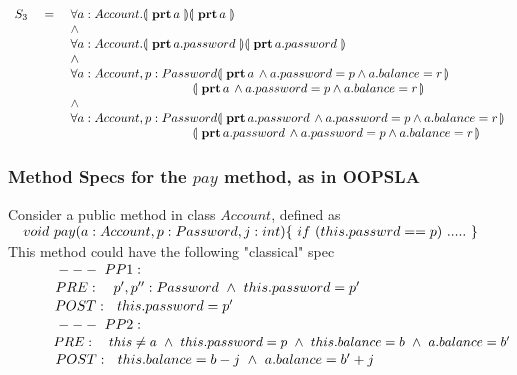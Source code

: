 \begin{example}
$\begin{array}{lcl}
S_3& \ = \ &  \TwoStatesQ {a: Account}{ \inside {a} } {  \inside {a}  }\\
& & \wedge \\
& &  \TwoStatesQ {a: Account}{ \inside {a.password} } {  \inside {a.password}  }\\
& & \wedge\\
& & \forall {a: Account, p: Password}\FirstState{ \inside {a}  \wedge a.password=p \wedge a.balance=r  } \\
& & \strut \hspace{3.45cm} 
                     \SecondState {  \inside {a}  \wedge a.password=p \wedge a.balance=r   }
                     \\
                     & & \wedge\\
& & \forall {a: Account, p: Password}\FirstState{   \inside {a.password} \wedge a.password=p \wedge a.balance=r  } \\
& & \strut \hspace{3.45cm} 
                     \SecondState { \inside {a.password}  \wedge a.password=p \wedge a.balance=r  }
\end{array}
$

\end{example}

\subsubsection{Method Specs for the $pay$ method, as in OOPSLA}

\newcommand{\SP}{~\strut \ \ \ \ \ \ \ \ \ }
Consider a public method in class $Account$, defined as \\
$\strut \ \ \  void\  pay(a: Account, p:Password, j: int)\{ \ if\ ( this.passwrd== p)\ .....\  \}$
\\
This method could have the following "classical" spec
\\ 
$\SP---\ PP1:$\\
$\SP PRE:\ \ \ p',p'' : Password \ \wedge \ this.password=p'  $
\\
$\SP POST: \ \  this.password=p'  $
\\
$\SP---\ PP2:$\\
$\SP PRE:\ \ \ this \neq a\  \wedge \ this.password=p   \ \wedge \ this.balance=b \ \wedge\ a.balance=b'$
\\
$\SP POST: \ \   this.balance=b-j \ \wedge\ a.balance=b'+j$
\\







